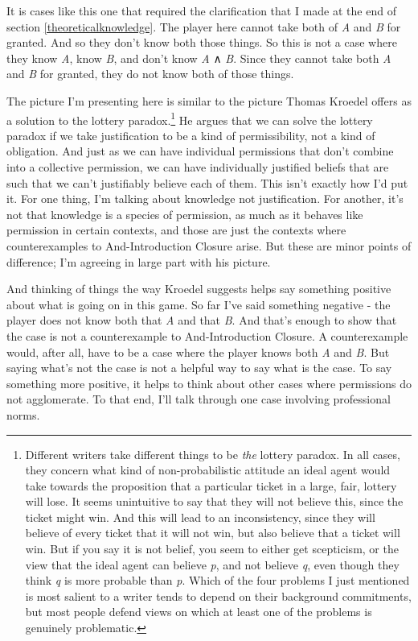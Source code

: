\documentclass[
  11pt,
]{book}
\begin{document}
It is cases like this one that required the clarification that I made at the end of section \ref{theoreticalknowledge}. The player here cannot take both of \emph{A} and \emph{B} for granted. And so they don't know both those things. So this is not a case where they know \emph{A}, know \emph{B}, and don't know \emph{A} ∧ \emph{B}. Since they cannot take both \emph{A} and \emph{B} for granted, they do not know both of those things.

The picture I'm presenting here is similar to the picture Thomas Kroedel \citeyearpar{Kroedel2012} offers as a solution to the lottery paradox.\footnote{Different writers take different things to be \emph{the} lottery paradox. In all cases, they concern what kind of non-probabilistic attitude an ideal agent would take towards the proposition that a particular ticket in a large, fair, lottery will lose. It seems unintuitive to say that they will not believe this, since the ticket might win. And this will lead to an inconsistency, since they will believe of every ticket that it will not win, but also believe that a ticket will win. But if you say it is not belief, you seem to either get scepticism, or the view that the ideal agent can believe \emph{p}, and not believe \emph{q}, even though they think \emph{q} is more probable than \emph{p}. Which of the four problems I just mentioned is most salient to a writer tends to depend on their background commitments, but most people defend views on which at least one of the problems is genuinely problematic.} He argues that we can solve the lottery paradox if we take justification to be a kind of permissibility, not a kind of obligation. And just as we can have individual permissions that don't combine into a collective permission, we can have individually justified beliefs that are such that we can't justifiably believe each of them. This isn't exactly how I'd put it. For one thing, I'm talking about knowledge not justification. For another, it's not that knowledge is a species of permission, as much as it behaves like permission in certain contexts, and those are just the contexts where counterexamples to And-Introduction Closure arise. But these are minor points of difference; I'm agreeing in large part with his picture.

And thinking of things the way Kroedel suggests helps say something positive about what is going on in this game. So far I've said something negative - the player does not know both that \emph{A} and that \emph{B}. And that's enough to show that the case is not a counterexample to And-Introduction Closure. A counterexample would, after all, have to be a case where the player knows both \emph{A} and \emph{B}. But saying what's not the case is not a helpful way to say what is the case. To say something more positive, it helps to think about other cases where permissions do not agglomerate. To that end, I'll talk through one case involving professional norms.
\end{document}
